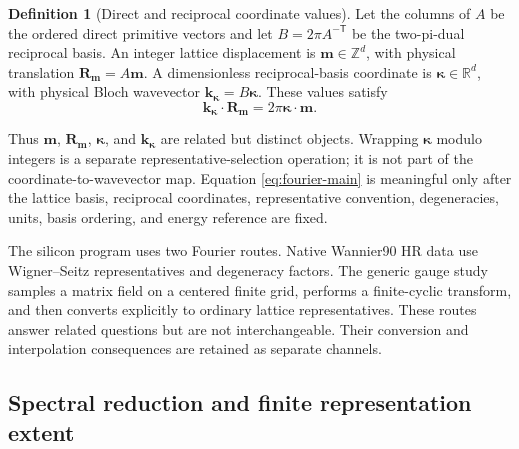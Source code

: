 \documentclass[11pt]{article}
\theoremstyle{definition}
\newtheorem{definition}[theorem]{Definition}
\begin{document}
\begin{definition}[Direct and reciprocal coordinate values]
\label{def:direct-reciprocal-coordinate-values}
Let the columns of $A$ be the ordered direct primitive vectors and let
$B=2\pi A^{-\mathsf T}$ be the two-pi-dual reciprocal basis.  An integer lattice
displacement is $\mathbf m\in\mathbb Z^d$, with physical translation
$\mathbf R_{\mathbf m}=A\mathbf m$.  A dimensionless reciprocal-basis coordinate is
$\boldsymbol\kappa\in\mathbb R^d$, with physical Bloch wavevector
$\mathbf k_{\boldsymbol\kappa}=B\boldsymbol\kappa$.  These values satisfy
\begin{equation}
 \mathbf k_{\boldsymbol\kappa}\cdot\mathbf R_{\mathbf m}
 =2\pi\boldsymbol\kappa\cdot\mathbf m.
 \label{eq:direct-reciprocal-coordinate-distinction}
\end{equation}
\end{definition}

Thus $\mathbf m$, $\mathbf R_{\mathbf m}$, $\boldsymbol\kappa$, and
$\mathbf k_{\boldsymbol\kappa}$ are related but distinct objects.  Wrapping
$\boldsymbol\kappa$ modulo integers is a separate representative-selection operation;
it is not part of the coordinate-to-wavevector map.  Equation
\eqref{eq:fourier-main} is meaningful only after the lattice basis, reciprocal
coordinates, representative convention, degeneracies, units, basis ordering, and
energy reference are fixed.

The silicon program uses two Fourier routes.  Native Wannier90 HR data use
Wigner--Seitz representatives and degeneracy factors.  The generic gauge study samples a
matrix field on a centered finite grid, performs a finite-cyclic transform, and then
converts explicitly to ordinary lattice representatives.  These routes answer related
questions but are not interchangeable.  Their conversion and interpolation consequences
are retained as separate channels.

\subsection{Spectral reduction and finite representation extent}
\end{document}
